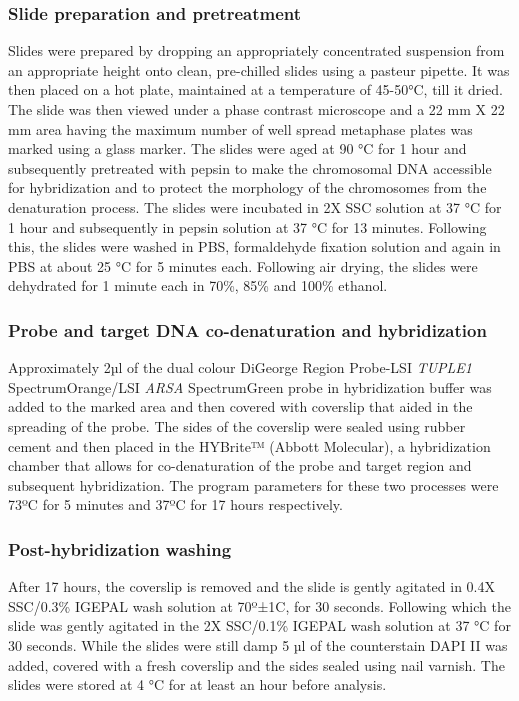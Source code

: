 \begin{refsection}
\subsubsection{Slide preparation and pretreatment}
Slides were prepared by dropping an appropriately concentrated suspension from an appropriate height onto clean, pre-chilled slides using a pasteur pipette. It was then placed on a hot plate, maintained at a temperature of 45-50°C, till it dried. The slide was then viewed under a phase contrast microscope and a 22 mm X 22 mm area having the maximum number of well spread metaphase plates was marked using a glass marker. The slides were aged at 90 °C for 1 hour and subsequently pretreated with pepsin to make the chromosomal DNA accessible for hybridization and to protect the morphology of the chromosomes from the denaturation process. The slides were incubated in 2X SSC solution at 37 °C for 1 hour and subsequently in pepsin solution at 37 °C for 13 minutes. Following this, the slides were washed in PBS, formaldehyde fixation solution and again in PBS at about 25 °C for 5 minutes each. Following air drying, the slides were dehydrated for 1 minute each in 70\%, 85\% and 100\% ethanol.
\subsubsection{Probe and target DNA co-denaturation and hybridization}
Approximately 2µl of the dual colour DiGeorge Region Probe-LSI \textit{TUPLE1} SpectrumOrange/LSI \textit{ARSA} SpectrumGreen probe in hybridization buffer was added to the marked area and then covered with coverslip that aided in the spreading of the probe. The sides of the coverslip were sealed using rubber cement and then placed in the HYBrite™ (Abbott Molecular), a hybridization chamber that allows for co-denaturation of the probe and target region and subsequent hybridization. The program parameters for these two processes were 73ºC for 5 minutes and 37ºC for 17 hours respectively.
\subsubsection{Post-hybridization washing}
After 17 hours, the coverslip is removed and the slide is gently agitated in 0.4X SSC/0.3\% IGEPAL wash solution at 70º±1C, for 30 seconds. Following which the slide was gently agitated in the 2X SSC/0.1\% IGEPAL wash solution at 37 °C for 30 seconds. While the slides were still damp 5 µl of the counterstain DAPI II was added, covered with a fresh coverslip and the sides sealed using nail varnish. The slides were stored at 4 °C for at least an hour before analysis.

\end{refsection}
